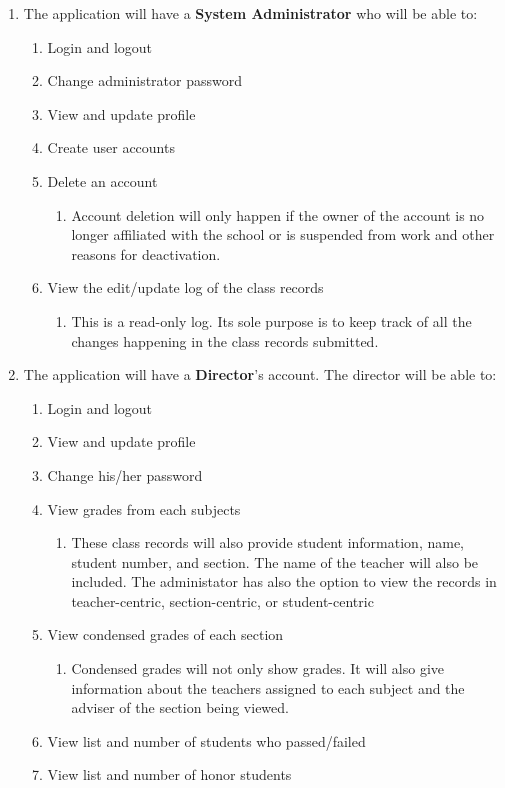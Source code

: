 \documentclass[11pt,a4paper,titlepage]{article}
\begin{document}
\begin{enumerate}
	\item The application will have a \textbf{System Administrator} who will be able to:
	\begin{enumerate}
		\item Login and logout
		\item Change administrator password
		\item View and update profile
		\item Create user accounts
        \item Delete an account
        \begin{enumerate}
            \item Account deletion will only happen if the owner of the account is no longer affiliated with the school or is suspended from work and other reasons for deactivation.
        \end{enumerate}
		\item View the edit/update log of the class records
		\begin{enumerate}
            \item This is a read-only log. Its sole purpose is to keep track of all the changes happening in the class records submitted.
        \end{enumerate}

	\end{enumerate}
	
	\item The application will have a \textbf{Director}'s account. The director will be able to:
	\begin{enumerate}
		\item Login and logout
		\item View and update profile
		\item Change his/her password
		\item View grades from each subjects
        \begin{enumerate}
            \item These class records will also provide student information, name, student number, and section. The name of the teacher will also be included. The administator has also the option to view the records in teacher-centric, section-centric, or student-centric
        \end{enumerate}
        \item View condensed grades of each section
        \begin{enumerate}
            \item Condensed grades will not only show grades. It will also give information about the teachers assigned to each subject and the adviser of the section being viewed.
        \end{enumerate}
        \item View list and number of students who passed/failed
        \item View list and number of honor students
    \end{enumerate}


\end{enumerate}
\end{document}
